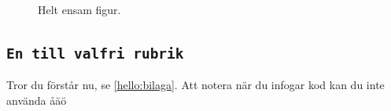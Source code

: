 \begin{figure}[ht]
    \centering
    \vspace{2mm}
	\caption{Helt ensam figur.}
	\label{fig:label}
\end{figure}

\subsection{\texttt{En till valfri rubrik}}
Tror du förstår nu, se \ref{hello:bilaga}.
Att notera när du infogar kod kan du inte använda åäö 


\lstset{tabsize=2,breaklines=true,numbers=left,basicstyle=\footnotesize,xleftmargin=30pt}



